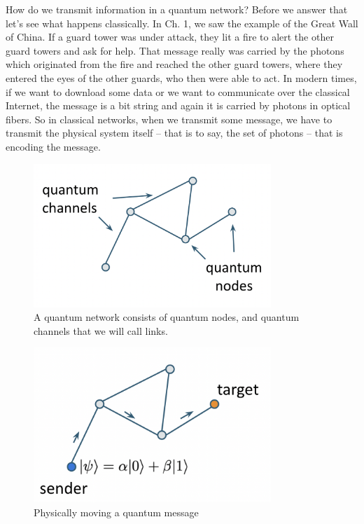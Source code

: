 How do we transmit information in a quantum network? Before we answer that let's see what happens classically. In Ch. 1, we saw the example of the Great Wall of China. If a guard tower was under attack, they lit a fire to alert the other guard towers and ask for help. That message really was carried by the photons which originated from the fire and reached the other guard towers, where they entered the eyes of the other guards, who then were able to act. In modern times, if we want to download some data or we want to communicate over the classical Internet, the message is a bit string and again it is carried by photons in optical fibers. So in classical networks, when we transmit some message, we have to transmit the physical system itself  -- that is to say, the set of photons -- that is encoding the message.
\begin{figure}[H]
    \centering
    \includegraphics[width=0.8\textwidth]{lesson8/quantum-network.png}
        \caption{A quantum network consists of quantum nodes, and quantum channels that we will call links.}
    \label{fig:quantum-network}
\end{figure}
\begin{figure}[H]
    \centering
    \includegraphics[width=0.8\textwidth]{lesson8/hop-by-hop.png}
        \caption{Physically moving a quantum message}
    \label{fig:hop-by-hop}
\end{figure}
